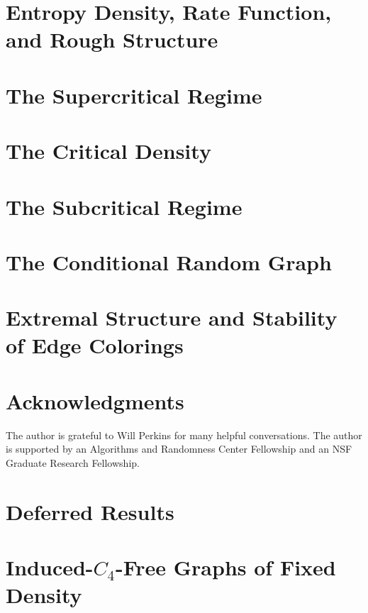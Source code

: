 \documentclass[11pt,letterpaper]{amsart}
\begin{document}
\section{Entropy Density, Rate Function, and Rough Structure}
\label{sec:entropy}


\section{The Supercritical Regime}
\label{sec:supercritical}


\section{The Critical Density}
\label{sec:critical}


\section{The Subcritical Regime}
\label{sec:subcritical}


\section{The Conditional \erdosrenyi{} Random Graph}
\label{sec:erdosrenyi}


\section{Extremal Structure and Stability of Edge Colorings}
\label{sec:edge-coloring}


\section*{Acknowledgments}
The author is grateful to Will Perkins for many helpful conversations. The author is supported by an Algorithms and Randomness Center Fellowship and an NSF Graduate Research Fellowship.

\printbibliography

\appendix
{}

\section{Deferred Results}
\label{sec:deferred}


\ActivateWarningFilters[pdftoc]
\section{Induced-$C_4$-Free Graphs of Fixed Density}
\DeactivateWarningFilters[pdftoc]
\label{sec:c4-free}

\end{document}
